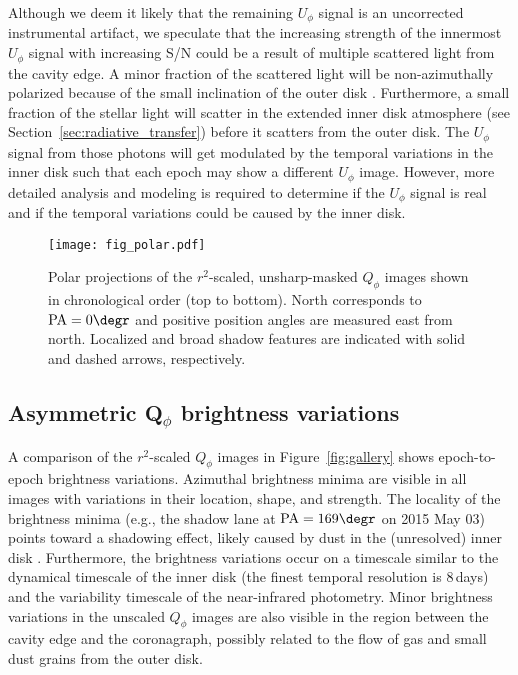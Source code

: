 \documentclass[twocolumn,tighten]{aastex61}
\begin{document}
Although we deem it likely that the remaining $U_\phi$ signal is an uncorrected instrumental artifact, we speculate that the increasing strength of the innermost $U_\phi$ signal with increasing S/N could be a result of multiple scattered light from the cavity edge. A minor fraction of the scattered light will be non-azimuthally polarized because of the small inclination of the outer disk \citep[$16\degr$--$20\degr$;][]{vandermarel2015,vandermarel2016}. Furthermore, a small fraction of the stellar light will scatter in the extended inner disk atmosphere (see Section~\ref{sec:radiative_transfer}) before it scatters from the outer disk. The $U_\phi$ signal from those photons will get modulated by the temporal variations in the inner disk such that each epoch may show a different $U_\phi$ image. However, more detailed analysis and modeling is required to determine if the $U_\phi$ signal is real and if the temporal variations could be caused by the inner disk.

\begin{figure}
\centering
\texttt{[image: fig\_polar.pdf]}
\caption{Polar projections of the $r^2$-scaled, unsharp-masked $Q_\phi$ images shown in chronological order (top to bottom). North corresponds to ${\rm PA} = 0\degr$ and positive position angles are measured east from north. Localized and broad shadow features are indicated with solid and dashed arrows, respectively.\label{fig:polar}}
\end{figure}

\subsection{Asymmetric Q$_\phi$ brightness variations}\label{sec:brightness_variations}

A comparison of the $r^2$-scaled $Q_\phi$ images in Figure~\ref{fig:gallery} shows epoch-to-epoch brightness variations. Azimuthal brightness minima are visible in all images with variations in their location, shape, and strength. The locality of the brightness minima (e.g., the shadow lane at ${\rm PA} = 169\degr$ on 2015 May 03) points toward a shadowing effect, likely caused by dust in the (unresolved) inner disk \citep{stolker2016}. Furthermore, the brightness variations occur on a timescale similar to the dynamical timescale of the inner disk (the finest temporal resolution is 8\,days) and the variability timescale of the near-infrared photometry. Minor brightness variations in the unscaled $Q_\phi$ images are also visible in the region between the cavity edge and the coronagraph, possibly related to the flow of gas and small dust grains from the outer disk.
\end{document}
